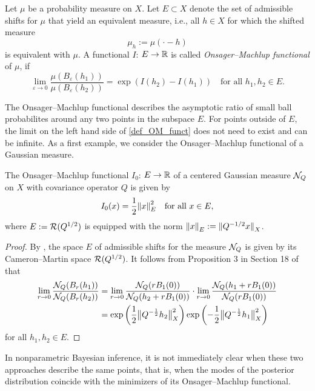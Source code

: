 \documentclass[english]{jnsao}
\theoremstyle{definition}
\begin{document}
\begin{definition}
	\label{def_omf}
	Let $\mu$ be a probability measure on $X$.
	Let $E \subset X$ denote the set of admissible shifts for $\mu$ that yield an equivalent measure, i.e., all $h \in X$ for which the shifted measure
	\begin{equation*}
		\mu_h := \mu(\cdot - h)
	\end{equation*}
	is equivalent with $\mu$.
	A functional $I$: $E \to {\mathbb{R}}$ is called \emph{Onsager--Machlup functional} of $\mu$, if
	\begin{equation}
		\label{def_OM_funct}
		\lim_{\varepsilon \to 0} \frac{\mu(B_\varepsilon(h_1))}{\mu(B_\varepsilon(h_2))} = \exp\left(I(h_2) - I(h_1)\right) \quad\text{for all }h_1,h_2 \in E.
	\end{equation}
\end{definition}

The Onsager--Machlup functional describes the asymptotic ratio of small ball probabilites around any two points in the subspace $E$. For points outside of $E$, the limit on the left hand side of \eqref{def_OM_funct} does not need to exist and can be infinite. As a first example, we consider the Onsager--Machlup functional of a Gaussian measure.

\begin{proposition}
	The Onsager--Machlup functional $I_0$: $E \to {\mathbb{R}}$ of a centered Gaussian measure $\mathcal{N}_Q$ on $X$ with covariance operator $Q$ is given by
	\[ I_0(x) = \frac12{\lVert x\rVert}_E^2 \quad \text{for all}~x \in E, \]
	where $E := \operatorname{\mathcal{R}}(Q^{1/2})$ is equipped with the norm ${\lVert x\rVert}_E := {\lVert Q^{-1/2}x\rVert}_X$.
\end{proposition}
\begin{proof}
By \cite[Thm.~2.3.1]{DaPrato:2001}, the space $E$ of admissible shifts for the measure $\mathcal{N}_Q$ is given by its Cameron--Martin space $\operatorname{\mathcal{R}}(Q^{1/2})$.
It follows from Proposition 3 in Section 18 of \cite{Lifshits:1995} that
\begin{align*}
	\lim_{r \to 0} \frac{\mathcal{N}_Q(B_r(h_1))}{\mathcal{N}_Q(B_r(h_2))}
	&= \lim_{r \to 0} \frac{\mathcal{N}_Q(rB_1(0))}{\mathcal{N}_Q(h_2 + rB_1(0))} \cdot \lim_{r \to 0} \frac{\mathcal{N}_Q(h_1 + rB_1(0))}{\mathcal{N}_Q(rB_1(0))} \\
	&= \exp \left(\frac12\big\|Q^{-\frac12}h_2\big\|_X^2\right) \exp \left(-\frac12\big\|Q^{-\frac12}h_1\big\|_X^2\right)
\end{align*}
for all $h_1,h_2 \in E$.
\end{proof}

In nonparametric Bayesian inference, it is not immediately clear when these two approaches describe the same points, that is, when the modes of the posterior distribution coincide with the minimizers of its Onsager--Machlup functional.
\end{document}
